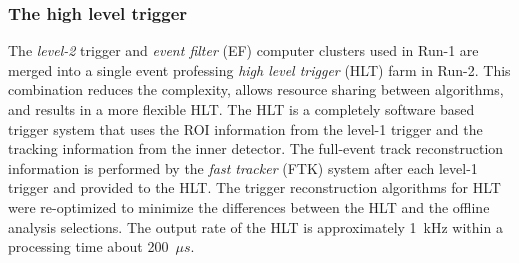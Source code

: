 
\subsubsection{The high level trigger}
\label{subsubsec:ae_HLT}
The \textit{level-2} trigger and \textit{event filter} (EF) computer clusters used in Run-1 are merged into a single event professing \textit{high level trigger} (HLT) farm in Run-2.
This combination reduces the complexity, allows resource sharing between algorithms, and results in a more flexible HLT.
The HLT is a completely software based trigger system that uses the ROI information from the level-1 trigger and the tracking information from the inner detector.
The full-event track reconstruction information is performed by the \textit{fast tracker} (FTK) system after each level-1 trigger and provided to the HLT.	 
The trigger reconstruction algorithms for HLT were re-optimized to minimize the differences between the HLT and the offline analysis selections.
The output rate of the HLT is approximately 1~kHz within a processing time about 200~$\mu s$.
